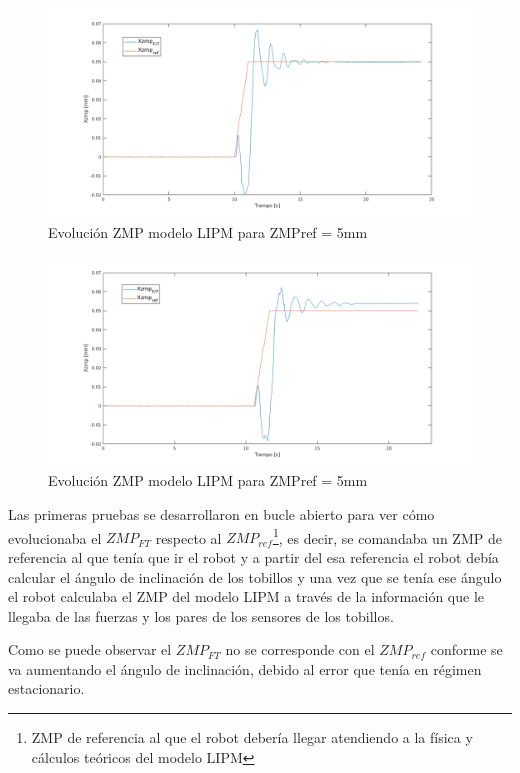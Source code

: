 \begin{figure}[H]
\centering
\includegraphics[scale=0.45]{imagenes/apartado_5/5.1/58}
\caption{Evolución ZMP modelo LIPM para ZMPref = 5mm}
\label{figura58}
\end{figure}

\begin{figure}[H]
\centering
\includegraphics[scale=0.45]{imagenes/apartado_5/5.1/59}
\caption{Evolución ZMP modelo LIPM para ZMPref = 5mm}
\label{figura59}
\end{figure}



Las primeras pruebas se desarrollaron en bucle abierto para ver cómo evolucionaba el $ZMP_{FT}$ respecto al $ZMP_{ref}$\footnote{ZMP de referencia al que el robot debería llegar atendiendo a la física y cálculos teóricos del modelo LIPM}, es decir, se comandaba un ZMP de referencia al que tenía que ir el robot y a  partir del esa referencia el robot debía calcular el ángulo de inclinación de los tobillos y una vez que se tenía ese ángulo el robot calculaba el ZMP del modelo LIPM a través de la información que le llegaba de las fuerzas y los pares de los sensores de los tobillos.
 
Como se puede observar el $ZMP_{FT}$ no se corresponde con el $ZMP_{ref}$ conforme se va aumentando el ángulo de inclinación, debido al error que tenía en régimen estacionario. 



